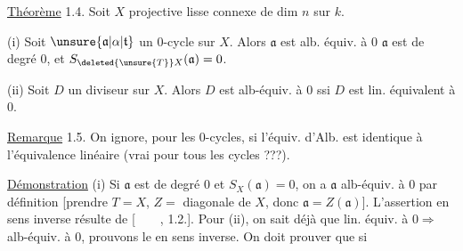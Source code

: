 
\uline{Théorème} 1.4. Soit $X$ projective lisse connexe de dim $n$ sur $k$. 

(i) Soit $\unsure{\mathfrak a|\alpha|\mathfrak{t}}$ un $0$-cycle sur $X$. Alors $\mathfrak a$ est alb. équiv. à $0$  $\mathfrak a$ est de degré $0$, et $S_{\deleted{\unsure{T}}X}(\mathfrak a)=0$.

(ii) Soit $D$ un diviseur sur $X$. Alors $D$ est alb-équiv. à $0$ ssi $D$ est lin. équivalent à $0$.

\uline{Remarque} 1.5. On ignore,  pour les $0$-cycles, si l'équiv. d'Alb. est identique à l'équivalence linéaire (vrai pour tous les cycles ???).

\uline{Démonstration} (i) Si $\mathfrak a$ est de degré $0$ et $S_X(\mathfrak a)=0$, on a $\mathfrak a$ alb-équiv. à $0$ par définition [prendre $T=X$, $Z=$ diagonale de $X$, donc $\mathfrak a=Z(\mathfrak a)$]. L'assertion en sens inverse résulte de [$\qquad$, 1.2.]. Pour (ii), on sait déjà que lin. équiv. à $0\Longrightarrow$ alb-équiv. à $0$, prouvons le en sens inverse. On doit prouver que si

